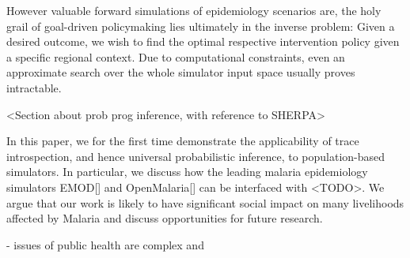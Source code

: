 \documentclass{article}
\begin{document}
However valuable forward simulations of epidemiology scenarios are, the holy grail of goal-driven policymaking lies ultimately in the inverse problem: Given a desired outcome, we wish to find the optimal respective intervention policy given a specific regional context. Due to computational constraints, even an approximate search over the whole simulator input space usually proves intractable.





<Section about prob prog inference, with reference to SHERPA>

In this paper, we for the first time demonstrate the applicability of trace introspection, and hence universal probabilistic inference, to population-based simulators. In particular, we discuss how the leading malaria epidemiology simulators EMOD[] and OpenMalaria[] can be interfaced with <TODO>. We argue that our work is likely to have significant social impact on many livelihoods affected by Malaria and discuss opportunities for future research.



- issues of public health are complex and 
\end{document}

